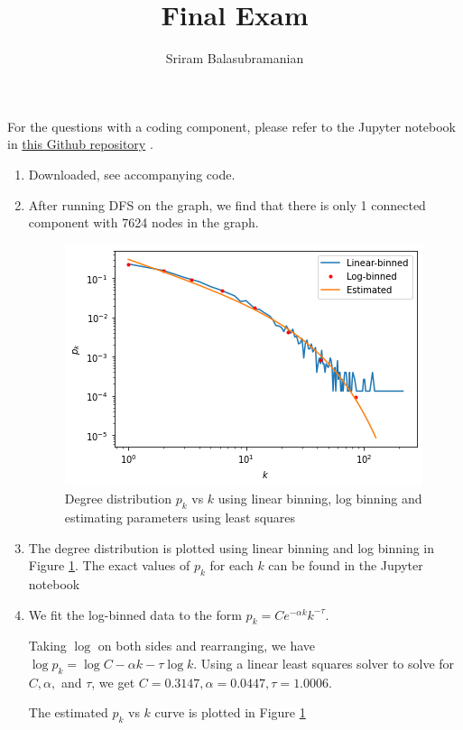 \documentclass{article}
\title{\textbf{Final Exam}}
\author{Sriram Balasubramanian}
\begin{document}
 \maketitle

For the questions with a coding component, please refer to the Jupyter notebook in \href{https://github.com/SriramB-98/CMSC828V-projects/tree/main/FinalExam}{this Github repository}
. 


\begin{enumerate}


\item Downloaded, see accompanying code.

\item After running DFS on the graph, we find that there is only 1 connected component with 7624 nodes in the graph. 

\begin{figure}
\centering
\includegraphics[scale=0.5]{pk_vs_k.png}
\caption{Degree distribution $p_k$ vs $k$ using linear binning, log binning and estimating parameters using least squares}
\label{fig:pk_vs_k}
\end{figure}

\item The degree distribution is plotted using linear binning and log binning in Figure \ref{fig:pk_vs_k}. The exact values of $p_k$ for each $k$ can be found in the Jupyter notebook

\item We fit the log-binned data to the form $p_k = Ce^{-\alpha k}k^{-\tau}$.

  Taking $\log$ on both sides and rearranging, we have $\log p_k = \log C -\alpha k -\tau \log k$. Using a linear least squares solver to solve for $C, \alpha, $ and $\tau$, we get $C = 0.3147, \alpha=0.0447, \tau = 1.0006$.
  
  The estimated $p_k$ vs $k$ curve is plotted in Figure \ref{fig:pk_vs_k}


\end{enumerate}
\end{document}

